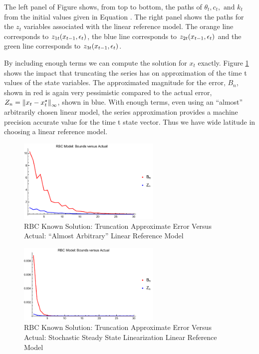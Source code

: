 \documentclass[12pt]{article}
\begin{document}
The left panel of Figure  shows, from top to bottom, the paths of $\theta_t, c_t, \text{ and } k_t$ from the initial values given in Equation .  The right panel shows the paths for the $z_t$ variables associated with the linear reference model. The orange line corresponds to $z_{1t}(x_{t-1},\epsilon_t)$,
the blue line corresponds to $z_{2t}(x_{t-1},\epsilon_t)$ and the green line corresponds to $z_{3t}(x_{t-1},\epsilon_t)$.%

By including enough terms we can compute the solution for $x_t$ 
exactly.
Figure \ref{rbcTrunc} shows the impact that truncating the series has 
on approximation of the time t values of the state variables.   The approximated magnitude for the error, $B_n$, shown in red 
 is again very pessimistic compared to the actual error, $Z_n=\left\lVert x_t-x_t^\star\right\rVert_\infty$, shown in blue.
With enough terms, even using an ``almost'' arbitrarily chosen linear model,  the series approximation provides a machine precision accurate value for the time t state vector.  Thus we have wide latitude in choosing a linear reference model.
\begin{figure}
  \centering
\includegraphics[width=2.7in]{simpArbBoundsVActual.pdf}  
  \caption{RBC Known Solution: Truncation Approximate Error  Versus Actual: ``Almost Arbitrary'' Linear Reference Model}
  \label{rbcTrunc}
\end{figure}
\begin{figure}
  \centering
\includegraphics[width=2.7in]{simpBoundsVActual.pdf}  
  \caption{RBC Known Solution: Truncation Approximate Error Versus Actual: Stochastic Steady State Linearization Linear Reference Model}
  \label{rbcTruncSimp}
\end{figure}
\end{document}
